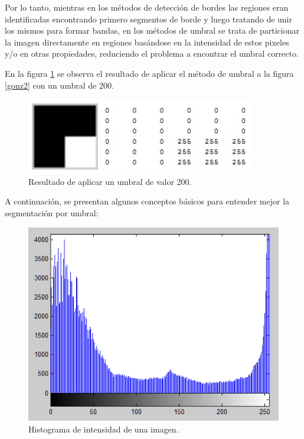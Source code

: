 Por lo tanto, mientras en los métodos de detección de bordes las regiones eran identificadas encontrando primero segmentos de borde y luego tratando de unir los mismos para formar bandas, en los métodos de umbral se trata de particionar la imagen directamente en regiones basándose en la intensidad de estos pixeles y/o en otras propiedades, reduciendo el problema a encontrar el umbral correcto.

En la figura \ref{gonz3} se observa el resultado de aplicar el método de umbral a la figura \ref{gonz2} con un umbral de 200.

\begin{figure}[hbt]
\begin{center}
\includegraphics[scale=0.8]{img/03_escala_grises_umbral.jpg}
\end{center}
\caption{Resultado de aplicar un umbral de valor 200.}
\label{gonz3}
\end{figure}

A continuación, se presentan algunos conceptos básicos para entender mejor la segmentación por umbral:

\begin{figure}[hbt]
\begin{center}
\includegraphics[scale=0.7]{img/otsu2.png}
\end{center}
\caption{Histograma de intensidad de una imagen\cite{histImgRef}.}
\label{otsuFruta}
\end{figure}

